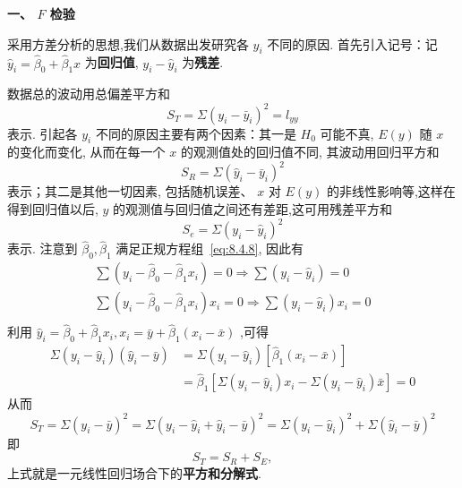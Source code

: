 \textbf{一、 $F$ 检验}

采用方差分析的思想,我们从数据出发研究各 $y_i$ 不同的原因. 首先引入记号：记 $\hat{y}_i = \hat{\beta}_0 + \hat{\beta}_1 x$ 为\textbf{回归值}, $y_i - \hat{y}_i$ 为\textbf{残差}. 

数据总的波动用总偏差平方和
\begin{equation}\label{eq:8.4.10}
S_T=\Sigma ( y_i - \bar{y}_i)^2 = l_{yy} 
\end{equation}
表示. 引起各 $y_i$ 不同的原因主要有两个因素：其一是 $H_0$ 可能不真, $E(y)$ 随 $x$ 的变化而变化, 从而在每一个 $x$ 的观测值处的回归值不同, 其波动用回归平方和
\begin{equation}
S_R=\Sigma{\left( \hat{y}_i-\bar{y}_i \right)}^2 \label{eq:8.4.11}  
\end{equation}
表示；其二是其他一切因素, 包括随机误差、 $x$ 对 $E(y)$ 的非线性影响等,这样在得到回归值以后, $y$ 的观测值与回归值之间还有差距,这可用残差平方和
\begin{equation}
S_{e}=\Sigma{\left( y_i-\hat{y}_i \right)}^2  
\end{equation}
表示.
注意到 $\hat{\beta}_0, \hat{\beta}_1$ 满足正规方程组~\ref{eq:8.4.8}, 因此有
\begin{equation*}
\begin{array}{c}
\sum{\left( y_i-\widehat{\beta }_0-\widehat{\beta }_1x_i \right) =0\Rightarrow \sum{\left( y_i-\hat{y}_i \right)}}=0\\
\sum{\left( y_i-\widehat{\beta }_0-\widehat{\beta }_1x_i \right) x_i=0\Rightarrow \sum{\left( y_i-\hat{y}_i \right)}}x_i=0\\
\end{array}
\end{equation*}
利用 $\widehat{y}_i=\widehat{\beta }_0+\widehat{\beta }_1x_i,x_i=\bar{y}+\widehat{\beta }_1\left( x_i-\bar{x} \right) $ ,可得 
\begin{equation*}
\begin{aligned} 
\Sigma\left(y_{i}-\hat{y}_{i}\right)\left(\hat{y}_{i}-\bar{y}\right) &=\Sigma\left(y_{i}-\hat{y}_{i}\right)\left[\hat{\beta}_{1}\left(x_{i}-\bar{x}\right)\right] \\ &=\hat{\beta}_{1}\left[\Sigma\left(y_{i}-\hat{y}_{i}\right) x_{i}-\Sigma\left(y_{i}-\hat{y}_{i}\right) \bar{x}\right]=0 
\end{aligned}
\end{equation*}
从而
\begin{equation*}
  S_{T} = \Sigma(y_{i}-\bar{y})^{2} = \Sigma(y_{i} - \hat{y}_{i} + \hat{y}_{i} - \bar{y})^{2} = \Sigma(y_{i} - \hat{y}_{i})^{2} + \Sigma(\hat{y}_{i}-\bar{y})^{2}
\end{equation*}
即
\begin{equation}
S_T = S_R + S_E, \label{eq:8.4.13}
\end{equation}
上式就是一元线性回归场合下的\textbf{平方和分解式}.

